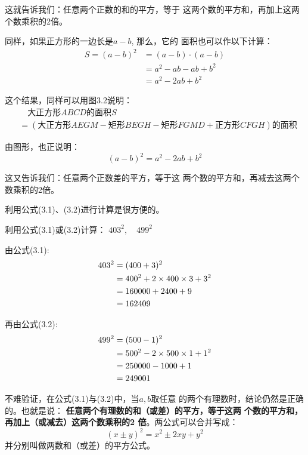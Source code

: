 这就告诉我们：任意两个正数的和的平方，等于
这两个数的平方和，再加上这两个数乘积的2倍。

同样，如果正方形的一边长是$a-b$, 那么，它的
面积也可以作以下计算：
\[\begin{split}
  S=(a-b)^2 &= ( a-b)\cdot (a-b)\\
  &=a^2-ab-ab+b^2\\
  &=a^2-2ab+b^2
\end{split}\]



这个结果，同样可以用图3.2说明：
\[\begin{split}
 & \quad \text{大正方形$ABCD$的面积$S$}\\
 &=(\text{大正方形}AEGM-\text{矩形}BEGH-\text{矩形}FGMD+\text{正方形}CFGH)\text{的面积}
\end{split}\]

由图形，也正说明：
\begin{equation}
    (a-b)^2=a^2-2ab+b^2
\end{equation}

这又告诉我们：任意两个正数差的平方，等于这
两个数的平方和，再减去这两个数乘积的2倍。

利用公式(3.1)、(3.2)进行计算是很方便的。

\begin{example}
利用公式(3.1)或(3.2)计算：
$403^2,\quad 499^2$
\end{example}

\begin{solution}
    由公式(3.1):
    \[\begin{split}
        403^2&=(400+3)^2\\
    &=400^2+2\times400\times3+3^2\\
    &=160000+2400+9\\
    &=162409
    \end{split}\]
    
    再由公式(3.2):
    \[\begin{split}
         499^2&=(500-1)^2\\
         &=500^2-2\times500\times1+1^2\\
         &=250000-1000+1\\
         &=249001   
    \end{split}\]
\end{solution}  

不难验证，在公式(3.1)与(3.2)中，当$a,b$取任意
的两个有理数时，结论仍然是正确的。也就是说：
\textbf{任意两个有理数的和（或差）的平方，等于这两
个数的平方和，再加上（或减去）这两个数乘积的2
倍}。两公式可以合并写成：
\[(x\pm y)^2=x^2\pm 2xy+y^2\]
并分别叫做两数和（或差）的平方公式。

